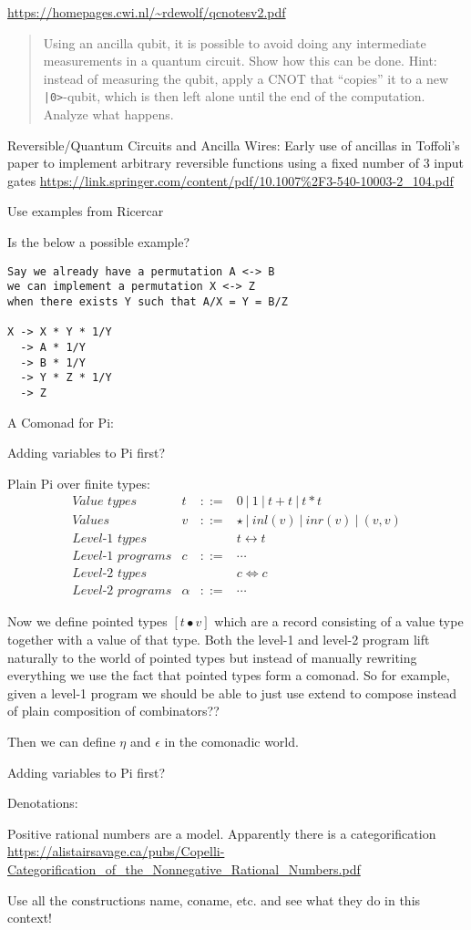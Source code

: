 \documentclass[sigplan,10pt,review,anonymous]{acmart}
\newcommand{\alt}{~|~}
\newcommand{\inlv}[1]{\ensuremath{\mathit{inl}(v)}}
\newcommand{\inrv}[1]{\ensuremath{\mathit{inr}(v)}}
\newcommand{\pointed}[2]{[#1 \bullet #2]}
\begin{document}
\url{https://homepages.cwi.nl/~rdewolf/qcnotesv2.pdf}
\begin{quote}
  Using an ancilla qubit, it is possible to avoid doing any
  intermediate measurements in a quantum circuit. Show how this can be
  done.  Hint: instead of measuring the qubit, apply a CNOT that
  “copies” it to a new \verb.|0>.-qubit, which is then left alone
  until the end of the computation. Analyze what happens.
\end{quote}


Reversible/Quantum Circuits and Ancilla Wires: Early use of ancillas
in Toffoli's paper to implement arbitrary reversible functions using a
fixed number of 3 input gates
\url{https://link.springer.com/content/pdf/10.1007%2F3-540-10003-2_104.pdf}

Use examples from Ricercar

Is the below a possible example?
\begin{verbatim}
Say we already have a permutation A <-> B
we can implement a permutation X <-> Z 
when there exists Y such that A/X = Y = B/Z

X -> X * Y * 1/Y 
  -> A * 1/Y
  -> B * 1/Y
  -> Y * Z * 1/Y
  -> Z
\end{verbatim}

A Comonad for Pi:

Adding variables to Pi first?

Plain Pi over finite types:
\[\begin{array}{lrcl}
\textit{Value types} & t &::=& 0 \alt 1 \alt t+t \alt t*t \\
\textit{Values}      & v &::=& \star \alt \inlv{v} \alt \inrv{v} \alt (v,v) \\
\textit{Level-1 types} &&& t \leftrightarrow t \\
\textit{Level-1 programs} & c &::=& \cdots \\
\textit{Level-2 types} &&& c \Leftrightarrow c \\
\textit{Level-2 programs} & \alpha &::=& \cdots 
\end{array}\]

Now we define pointed types $\pointed{t}{v}$ which are a record
consisting of a value type together with a value of that type. Both
the level-1 and level-2 program lift naturally to the world of pointed
types but instead of manually rewriting everything we use the fact
that pointed types form a comonad. So for example, given a level-1
program we should be able to just use \textsf{extend} to compose
instead of plain composition of combinators??

Then we can define $\eta$ and $\epsilon$ in the comonadic world.

Adding variables to Pi first? 
 
Denotations:
 
Positive rational numbers are a model. Apparently there is a
categorification
\url{https://alistairsavage.ca/pubs/Copelli-Categorification_of_the_Nonnegative_Rational_Numbers.pdf}

Use all the constructions name, coname, etc. and see what they do in this context!


\end{document}

